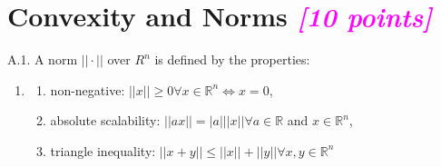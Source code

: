 \documentclass{article}
\newcommand{\field}[1]{\mathbb{#1}}
\newcommand{\1}{\mathbf{1}}
\newcommand{\R}{\field{R}} %
\newcommand{\points}[1]{\small\textcolor{magenta}{\emph{[#1 points]}} \normalsize}
\begin{document}
\section*{Convexity and Norms \points{10}}
A.1. A norm $||\cdot||$ over $R^n$ is defined by the properties:
\begin{enumerate}
\item[] \begin{enumerate}
    \item non-negative: $||x||\ge 0 \forall x \in \R^n \iff x= 0$,
    \item absolute scalability: $||ax|| = |a| ||x|| \forall a \in \R$  and $x\in\R^n$,
    \item triangle inequality: $||x+y|| \le ||x|| + ||y|| \forall x,y \in \R^n$
\end{enumerate}


\end{enumerate}
\end{document}
